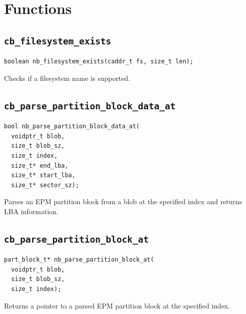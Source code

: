 \documentclass[12pt]{article}
\begin{document}
\section{Functions}

\subsection{\texttt{cb\_filesystem\_exists}}
\begin{lstlisting}[style=customc]
boolean nb_filesystem_exists(caddr_t fs, size_t len);
\end{lstlisting}
Checks if a filesystem name is supported.

\subsection{\texttt{cb\_parse\_partition\_block\_data\_at}}
\begin{lstlisting}[style=customc]
bool nb_parse_partition_block_data_at(
  voidptr_t blob,
  size_t blob_sz,
  size_t index,
  size_t* end_lba,
  size_t* start_lba,
  size_t* sector_sz);
\end{lstlisting}
Parses an EPM partition block from a blob at the specified index and returns LBA information.

\subsection{\texttt{cb\_parse\_partition\_block\_at}}
\begin{lstlisting}[style=customc]
part_block_t* nb_parse_partition_block_at(
  voidptr_t blob,
  size_t blob_sz,
  size_t index);
\end{lstlisting}
Returns a pointer to a parsed EPM partition block at the specified index.
\end{document}
